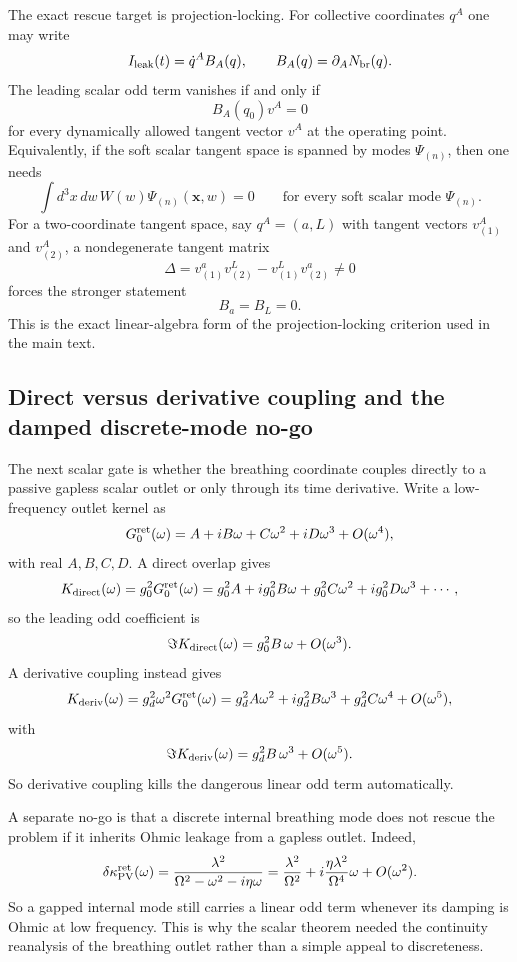 \documentclass[11pt]{article}
\begin{document}
The exact rescue target is projection-locking.  For collective coordinates
$q^A$ one may write
\[
I_{\rm leak}(t)=\dot q^A B_A(q),
\qquad
B_A(q)=\partial_A N_{\rm br}(q).
\]
The leading scalar odd term vanishes if and only if
\[
\boxed{B_A(q_0)v^A=0}
\]
for every dynamically allowed tangent vector $v^A$ at the operating point.
Equivalently, if the soft scalar tangent space is spanned by modes
$\Psi_{(n)}$, then one needs
\[
\int d^3x\,dw\,W(w)\Psi_{(n)}(\mathbf x,w)=0
\qquad
\text{for every soft scalar mode }\Psi_{(n)}.
\]
For a two-coordinate tangent space, say $q^A=(a,L)$ with tangent vectors
$v_{(1)}^A$ and $v_{(2)}^A$, a nondegenerate tangent matrix
\[
\Delta=v_{(1)}^a v_{(2)}^L-v_{(1)}^L v_{(2)}^a\neq0
\]
forces the stronger statement
\[
B_a=B_L=0.
\]
This is the exact linear-algebra form of the projection-locking criterion used
in the main text.

\subsection{Direct versus derivative coupling and the damped discrete-mode no-go}
\label{app:scalar-ledger-direct-vs-derivative}

The next scalar gate is whether the breathing coordinate couples directly to a
passive gapless scalar outlet or only through its time derivative.  Write a
low-frequency outlet kernel as
\[
G_0^{\rm ret}(\omega)=A+iB\omega+C\omega^2+iD\omega^3+O(\omega^4),
\]
with real $A,B,C,D$.  A direct overlap gives
\[
K_{\rm direct}(\omega)=g_0^2 G_0^{\rm ret}(\omega)
=
g_0^2A+ig_0^2B\omega+g_0^2C\omega^2+ig_0^2D\omega^3+\cdots,
\]
so the leading odd coefficient is
\[
\Im K_{\rm direct}(\omega)=g_0^2B\,\omega+O(\omega^3).
\]
A derivative coupling instead gives
\[
K_{\rm deriv}(\omega)=g_d^2\omega^2G_0^{\rm ret}(\omega)
=
g_d^2A\omega^2+ig_d^2B\omega^3+g_d^2C\omega^4+O(\omega^5),
\]
with
\[
\Im K_{\rm deriv}(\omega)=g_d^2B\,\omega^3+O(\omega^5).
\]
So derivative coupling kills the dangerous linear odd term automatically.

A separate no-go is that a discrete internal breathing mode does not rescue the
problem if it inherits Ohmic leakage from a gapless outlet.  Indeed,
\[
\delta\kappa_{\rm PV}^{\rm ret}(\omega)
=
\frac{\lambda^2}{\Omega^2-\omega^2-i\eta\omega}
=
\frac{\lambda^2}{\Omega^2}
+
i\frac{\eta\lambda^2}{\Omega^4}\omega
+
O(\omega^2).
\]
So a gapped internal mode still carries a linear odd term whenever its damping is
Ohmic at low frequency.  This is why the scalar theorem needed the continuity
reanalysis of the breathing outlet rather than a simple appeal to discreteness.
\end{document}
